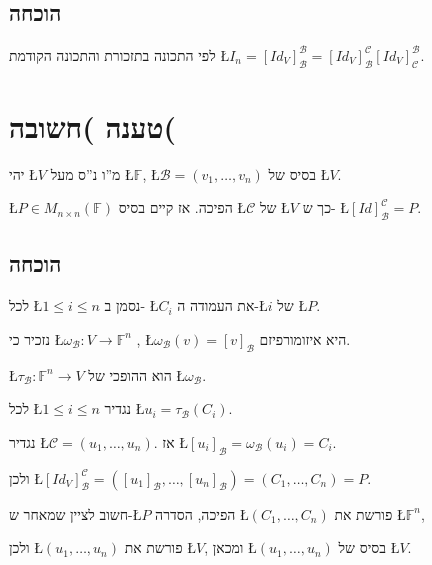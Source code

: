 \documentclass[english,hebrew]{article}
\newcommand{\sqrmn}{M_{n\times n}(\mathbb{F})}
\begin{document}
\subsection{הוכחה}

לפי התכונה בתזכורת והתכונה הקודמת \L{$I_{n}=[Id_{V}]_{\mathcal{B}}^{\mathcal{B}}=[Id_{V}]_{\mathcal{B}}^{\mathcal{C}}[Id_{V}]_{\mathcal{C}}^{\mathcal{B}}$}.

\section{טענה )חשובה(}

יהי \L{$V$} מ\textquotedblright ו נ\textquotedblright ס מעל \L{$\mathbb{F}$},
\L{$\mathcal{B}=\left(v_{1},\dots,v_{n}\right)$} בסיס של \L{$V$}.

\L{$P\in\sqrmn$} הפיכה. אז קיים בסיס \L{$\mathcal{C}$} של \L{$V$}
כך ש- \L{$[Id]_{\mathcal{B}}^{\mathcal{C}}=P$}.

\subsection{הוכחה}

לכל \L{$1\leq i\leq n$} נסמן ב- \L{$C_{i}$} את העמודה ה-\L{$i$}
של \L{$P$}.

נזכיר כי \L{$\omega_{\mathcal{B}}:V\rightarrow\mathbb{F}^{n}$} ,
\L{$\omega_{\mathcal{B}}(v)=[v]_{\mathcal{B}}$} היא איזומורפיזם.

\L{$\tau_{\mathcal{B}}:\mathbb{F}^{n}\rightarrow V$} הוא ההופכי של
\L{$\omega_{\mathcal{B}}$}.

לכל \L{$1\leq i\leq n$} נגדיר \L{$u_{i}=\tau_{\mathcal{B}}(C_{i})$}.

נגדיר \L{$\mathcal{C}=(u_{1},\dots,u_{n})$}. אז \L{$[u_{i}]_{\mathcal{B}}=\omega_{\mathcal{B}}(u_{i})=C_{i}$}.

ולכן \L{$[Id_{V}]_{\mathcal{B}}^{\mathcal{C}}=([u_{1}]_{\mathcal{B}},\dots,[u_{n}]_{\mathcal{B}})=(C_{1},\dots,C_{n})=P$}.

חשוב לציין שמאחר ש-\L{$P$} הפיכה, הסדרה \L{$(C_{1},\dots,C_{n})$}
פורשת את \L{$\mathbb{F}^{n}$},

ולכן \L{$(u_{1},\dots,u_{n})$} פורשת את \L{$V$}, ומכאן \L{$(u_{1},\dots,u_{n})$}
בסיס של \L{$V$}.

\newpage{}

\noindent{}
\end{document}
